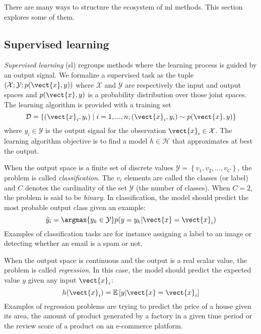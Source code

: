There are many ways to structure the ecosystem of \acrlong{ml} methods. This
section explores some of them.

\subsection{Supervised learning}
\label{ssec:backml:sl}

\textit{Supervised learning} (\acrshort{sl}) regroups methods where the learning
process is guided by an output signal. We formalize a supervised task as the tuple
$\left(\mathcal{X}; \mathcal{Y}; p(\vect{x}, y)\right)$ where $\mathcal{X}$ and
$\mathcal{Y}$ are respectively the input and output spaces and $p(\vect{x}, y)$
is a probability distribution over those joint spaces. The learning algorithm is
provided with a training set
\begin{equation}
\label{eqn:backml:supervised}
\mathcal{D} = \left\{(\vect{x}_i, y_i) \mid i = 1,...,n ; (\vect{x}_i, y_i) \sim p(\vect{x}, y) \right\}
\end{equation}
where $y_i \in \mathcal{Y}$ is the output signal for the observation
$\vect{x}_i \in \mathcal{X}$. The learning algorithm objective is to find a model
$h \in \mathcal{H}$ that approximates at best the output.

When the output space is a finite set of discrete values
$\mathcal{Y} = \left\{v_1, v_2, ..., v_C\right\}$, the problem is called
\textit{classification}. The $v_i$ elements are called the classes (or label) and
$C$ denotes the cardinality of the set $\mathcal{Y}$ (\ie the number of classes).
When $C = 2$, the problem is said to be \textit{binary}. In classification, the
model should predict the most probable output class given an example:
\begin{equation}
\hat{y}_i = \argmax{y_k \in \mathcal{Y}} p(y=y_k|\vect{x}=\vect{x}_i)
\end{equation}
Examples of classification tasks are for instance assigning a label to an image
or detecting whether an email is a spam or not.

When the output space is continuous and the output is a real scalar value, the
problem is called \textit{regression}. In this case, the model should predict the
expected value $y$ given any input $\vect{x}_i$:
\begin{equation}
h(\vect{x}_i) = \mathbb{E}\left[y|\vect{x}=\vect{x}_i\right]
\end{equation}
Examples of regression problems are trying to predict the price of a house given
its area, the amount of product generated by a factory in a given time period or
the review score of a product on an e-commerce platform.


